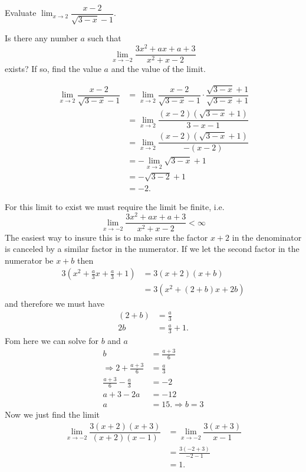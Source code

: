 \documentclass{hwset}
\begin{document}
\begin{problem}[1.]
	\be 
		\item Evaluate $\lim_{x\to 2}\dfrac{x-2}{\sqrt{3-x}-1}$.
		\item Is there any number $a$ such that
		\begin{equation*}
			\lim_{x\to-2}\dfrac{3x^{2}+ax+a+3}{x^2+x-2}
		\end{equation*}
		exists? If so, find the value $a$ and the value of the limit.
	\ee
\end{problem}

\be
\item
\begin{solution}
	\begin{align*}
		\lim_{x\to 2} \dfrac{x-2}{\sqrt{3-x}-1} &= \lim_{x\to 2}
			\dfrac{x-2}{\sqrt{3-x}-1} \cdot \dfrac{\sqrt{3-x}+1}{\sqrt{3-x}+1} \\
		&= \lim_{x\to 2} \dfrac{(x-2)\left(\sqrt{3-x}+1\right)}{3-x-1} \\
		&= \lim_{x\to 2} \dfrac{(x-2)\left(\sqrt{3-x}+1\right)}{-(x-2)} \\
		&= -\lim_{x\to 2} \sqrt{3-x}+1 \\
		&= -\sqrt{3-2}+1 \\
		&= \boxed{-2.} 
	\end{align*}
\end{solution}
\item
\begin{solution}
	For this limit to exist we must require the limit be finite, i.e.
	\begin{equation*}
		\lim_{x\to-2}\dfrac{3x^{2}+ax+a+3}{x^2+x-2} < \infty
	\end{equation*}
	The easiest way to insure this is to make sure the factor $x+2$ in the
	denominator is canceled by a similar factor in the numerator. If we let the
	second factor in the numerator be $x+b$ then
	\begin{align*}
			3\left(x^{2}+\frac{a}{3}x+\frac{a}{3}+1\right) &= 3(x+2)(x+b) \\ 
			&= 3(x^2 + (2+b)x + 2b) 
	\end{align*}
	and therefore we must have
	\begin{align*}
		(2+b) &= \frac{a}{3} \\
		2b &= \frac{a}{3} + 1.
	\end{align*}
	Fom here we can solve for $b$ and $a$
	\begin{align*}
		b &= \frac{a + 3}{6} \\
		\Rightarrow 2 + \frac{a + 3}{6} &= \frac{a}{3} \\
		\frac{a + 3}{6} - \frac{a}{3} &= -2 \\
		a + 3 - 2a &= -12 \\
		a &= \boxed{15.} \Rightarrow b = 3 
	\end{align*}
	Now we just find the limit
	\begin{align*}
		\lim_{x\to -2} \dfrac{3(x+2)(x+3)}{(x+2)(x-1)} &= \lim_{x\to -2} \dfrac{3(x+3)}{x-1} \\
		&= \frac{3(-2+3)}{-2-1} \\
		&= \boxed{1.}
	\end{align*}
\end{solution}
\ee
\end{document}
